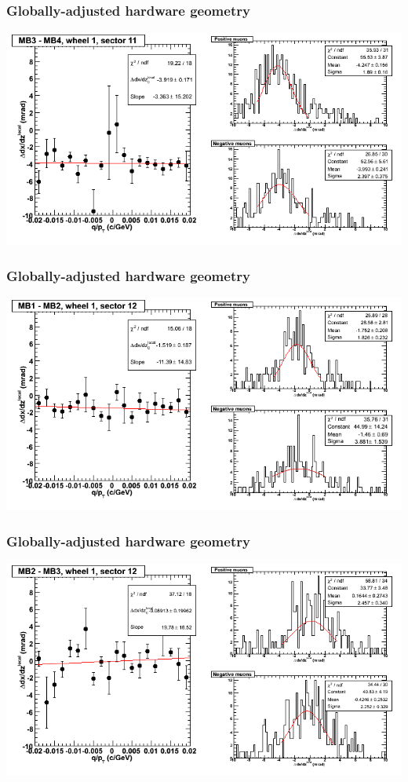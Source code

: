 \documentclass[compress]{beamer}
\begin{document}
\begin{frame}
\frametitle{Globally-adjusted hardware geometry}
\includegraphics[width=\linewidth]{NOV4_segdiffs_HW/dt13_slope_D_11_34.png}
\end{frame}

\begin{frame}
\frametitle{Globally-adjusted hardware geometry}
\includegraphics[width=\linewidth]{NOV4_segdiffs_HW/dt13_slope_D_12_12.png}
\end{frame}

\begin{frame}
\frametitle{Globally-adjusted hardware geometry}
\includegraphics[width=\linewidth]{NOV4_segdiffs_HW/dt13_slope_D_12_23.png}
\end{frame}
\end{document}
